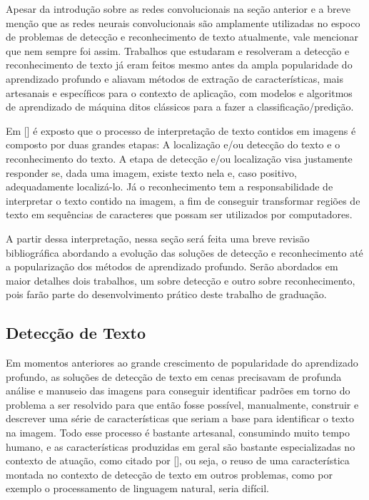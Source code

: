 Apesar da introdução sobre as redes convolucionais na seção anterior e a breve menção que as redes neurais convolucionais são amplamente utilizadas no espoco de problemas de detecção e reconhecimento de texto atualmente, vale mencionar que nem sempre foi assim. Trabalhos que estudaram e resolveram a detecção e reconhecimento de texto já eram feitos mesmo antes da ampla popularidade do aprendizado profundo e aliavam métodos de extração de características, mais artesanais e específicos para o contexto de aplicação, com modelos e algoritmos de aprendizado de máquina ditos clássicos para a fazer a classificação/predição.

Em [] é exposto que o processo de interpretação de texto contidos em imagens é composto por duas grandes etapas: A localização e/ou detecção do texto e o reconhecimento do texto. A etapa de detecção e/ou localização visa justamente responder se, dada uma imagem, existe texto nela e, caso positivo, adequadamente localizá-lo. Já o reconhecimento tem a responsabilidade de interpretar o texto contido na imagem, a fim de conseguir transformar regiões de texto em sequências de caracteres que possam ser utilizados por computadores.

A partir dessa interpretação, nessa seção será feita uma breve revisão bibliográfica abordando a evolução das soluções de detecção e reconhecimento até a popularização dos métodos de aprendizado profundo. Serão abordados em maior detalhes dois trabalhos, um sobre detecção e outro sobre reconhecimento, pois farão parte do desenvolvimento prático deste trabalho de graduação.


\subsection{Detecção de Texto}
Em momentos anteriores ao grande crescimento de popularidade do aprendizado profundo, as soluções de detecção de texto em cenas precisavam de profunda análise e manuseio das imagens para conseguir identificar padrões em torno do problema a ser resolvido para que então fosse possível, manualmente, construir e descrever uma série de características que seriam a base para identificar o texto na imagem. Todo esse processo é bastante artesanal, consumindo muito tempo humano, e as características produzidas em geral são bastante especializadas no contexto de atuação, como citado por [], ou seja, o reuso de uma característica montada no contexto de detecção de texto em outros problemas, como por exemplo o processamento de linguagem natural, seria difícil.

